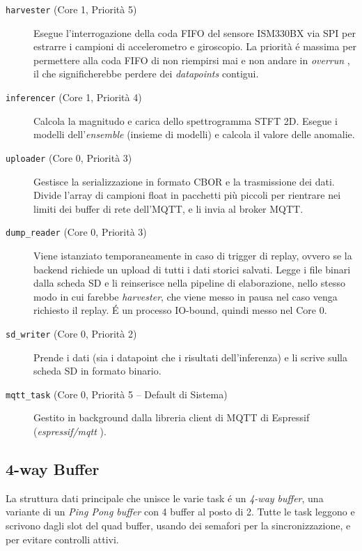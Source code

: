 \begin{description}
	\item[\texttt{harvester} (Core 1, Priorità 5)] Esegue l'interrogazione della coda FIFO del sensore ISM330BX via SPI per estrarre i campioni di accelerometro e giroscopio. La priorità é massima per permettere alla coda FIFO di non riempirsi mai e non andare in \textit{overrun} \cite{ism330bx_datasheet}, il che significherebbe perdere dei \textit{datapoints} contigui.

	\item[\texttt{inferencer} (Core 1, Priorità 4)] Calcola la magnitudo e carica dello spettrogramma STFT 2D. Esegue i modelli dell'\textit{ensemble} (insieme di modelli) e calcola il valore delle anomalie.

	\item[\texttt{uploader} (Core 0, Priorità 3)] Gestisce la serializzazione in formato CBOR e la trasmissione dei dati. Divide l'array di campioni float in pacchetti più piccoli per rientrare nei limiti dei buffer di rete dell'MQTT, e li invia al broker MQTT. %


	\item[\texttt{dump\_reader} (Core 0, Priorità 3)] Viene istanziato temporaneamente in caso di trigger di replay, ovvero se la backend richiede un upload di tutti i dati storici salvati. Legge i file binari dalla scheda SD e li reinserisce nella pipeline di elaborazione, nello stesso modo in cui farebbe \textit{harvester}, che viene messo in pausa nel caso venga richiesto il replay. É un processo IO-bound, quindi messo nel Core 0.

	\item[\texttt{sd\_writer} (Core 0, Priorità 2)] Prende i dati (sia i datapoint che i risultati dell'inferenza) e li scrive sulla scheda SD in formato binario.

	\item[\texttt{mqtt\_task} (Core 0, Priorità 5 -- Default di Sistema)] Gestito in background dalla libreria client di MQTT di Espressif (\textit{espressif/mqtt} \cite{espressif_esp_mqtt}).
\end{description}

\subsection{4-way Buffer}

La struttura dati principale che unisce le varie task é un \textit{4-way buffer}, una variante di un \textit{Ping Pong buffer} \cite{lyons2010dsp} con 4 buffer al posto di 2.
Tutte le task leggono e scrivono dagli slot del quad buffer, usando dei semafori per la sincronizzazione, e per evitare controlli attivi.

